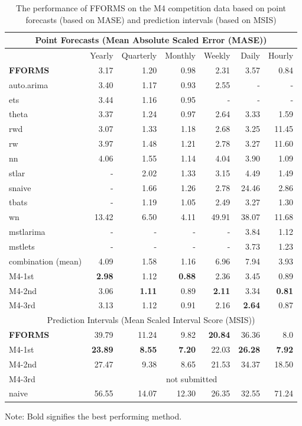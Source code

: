 \documentclass[11pt,a4paper,]{article}
\begin{document}
\begin{table}[!h]
\centering\scriptsize\tabcolsep=0.12cm
\begin{threeparttable}
\caption{The performance of FFORMS on the M4 competition data based on point forecasts (based on MASE) and prediction intervals (based on MSIS)}
\label{forecasts}
\begin{tabular}{l|rrrrrr}
\hline
\multicolumn{7}{c}{Point Forecasts (Mean Absolute Scaled Error (MASE))} \\\hline
 & Yearly & Quarterly & Monthly & Weekly & Daily & Hourly \\\hline
\bf{FFORMS} & 3.17 &  1.20 &  0.98&  2.31& 3.57 &  0.84\\
auto.arima & 3.40 &1.17  &0.93  & 2.55 &  -& - \\
ets & 3.44 &  1.16& 0.95 &  -&-  &  -\\
theta & 3.37 &1.24  & 0.97 &2.64  & 3.33 & 1.59 \\
rwd & 3.07 & 1.33 & 1.18  & 2.68  & 3.25 & 11.45 \\
rw & 3.97 & 1.48 & 1.21  &2.78  & 3.27 & 11.60 \\
nn & 4.06 & 1.55 &  1.14 &4.04 & 3.90 & 1.09 \\
stlar & - & 2.02 &  1.33& 3.15 & 4.49 & 1.49 \\
snaive & - &  1.66& 1.26 &  2.78& 24.46 & 2.86 \\
tbats & - & 1.19 &  1.05& 2.49 & 3.27 &  1.30\\
wn & 13.42 &  6.50&  4.11&  49.91& 38.07 & 11.68 \\
mstlarima & - & - &  - & - & 3.84 &  1.12\\
mstlets & - &  - &  - &  - & 3.73 &  1.23\\
combination (mean) & 4.09 & 1.58 &  1.16&6.96  & 7.94 & 3.93 \\\hline
M4-1st & \bf{2.98} & 1.12 &  \bf{0.88}& 2.36 & 3.45 & 0.89\\
M4-2nd & 3.06 & \bf{1.11} &  0.89& \bf{2.11} & 3.34 & \bf{0.81}\\
M4-3rd & 3.13 & 1.12 &  0.91& 2.16 & \bf{2.64} & 0.87\\\hline
\multicolumn{7}{c}{Prediction Intervals (Mean Scaled Interval Score (MSIS))} \\\hline
\bf{FFORMS} & 39.79 &  11.24 &  9.82&  \bf{20.84}& 36.36 & 8.0 \\
M4-1st & \bf{23.89} & \bf{8.55} &  \bf{7.20} & 22.03 & \bf{26.28} & \bf{7.92}\\
M4-2nd & 27.47 & 9.38 &  8.65& 21.53 & 34.37 & 18.50\\
M4-3rd & \multicolumn{6}{c}{not submitted}\\
naive & 56.55 & 14.07 &  12.30 & 26.35 & 32.55 & 71.24\\\hline
\end{tabular}
  \begin{tablenotes}
      \scriptsize
      \item Note: Bold signifies the best performing method.
    \end{tablenotes}
  \end{threeparttable}
\end{table}
\end{document}

